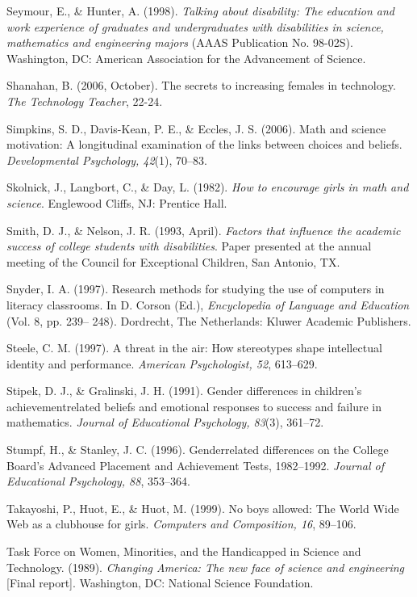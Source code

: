 \documentclass[11.5pt]{sig-alternate} %
\begin{document}
Seymour, E., \& Hunter, A. (1998). \textit{Talking about disability: The education and work experience of graduates and undergraduates with disabilities in science, mathematics and engineering majors} (AAAS Publication No. 98-02S). Washington, DC: American Association for the Advancement of Science. 
 
Shanahan, B. (2006, October). The secrets to increasing females in technology. \textit{The Technology Teacher}, 22-24. 
 
Simpkins, S. D., Davis-Kean, P. E., \& Eccles, J. S. (2006). Math and science motivation: A longitudinal examination of the links between choices and beliefs. \textit{Developmental Psychology, 42}(1), 70–83. 
 
Skolnick, J., Langbort, C., \& Day, L. (1982). \textit{How to encourage girls in math and science}. Englewood Cliffs, NJ: Prentice Hall. 
 
Smith, D. J., \& Nelson, J. R. (1993, April). \textit{Factors that influence the academic success of college students with disabilities}. Paper presented at the annual meeting of the Council for Exceptional Children, San Antonio, TX.  
 
Snyder, I. A. (1997). Research methods for studying the use of computers in literacy classrooms. In D. Corson (Ed.), \textit{Encyclopedia of Language and Education} (Vol. 8, pp. 239– 248). Dordrecht, The Netherlands: Kluwer Academic Publishers.  
 
Steele, C. M. (1997). A threat in the air: How stereotypes shape intellectual identity and performance. \textit{American Psychologist, 52}, 613–629. 
 
Stipek, D. J., \& Gralinski, J. H. (1991). Gender differences in children's achievementrelated beliefs and emotional responses to success and failure in mathematics. \textit{Journal of Educational Psychology, 83}(3), 361–72.  
 
Stumpf, H., \& Stanley, J. C. (1996). Genderrelated differences on the College Board’s Advanced Placement and Achievement Tests, 1982–1992. \textit{Journal of Educational Psychology, 88}, 353–364.  
 
Takayoshi, P., Huot, E., \& Huot, M. (1999). No boys allowed: The World Wide Web as a clubhouse for girls. \textit{Computers and Composition, 16}, 89–106.  
 
Task Force on Women, Minorities, and the Handicapped in Science and Technology. (1989). \textit{Changing America: The new face of science and engineering} [Final report]. Washington, DC: National Science Foundation.  
 
\end{document}

